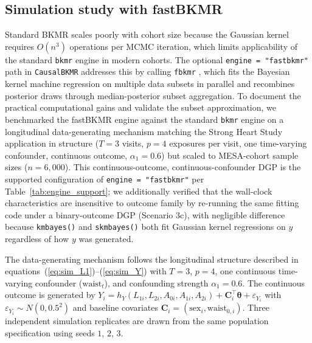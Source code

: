 \documentclass[11pt]{article}
\newcommand{\pkg}[1]{\texttt{#1}}
\newcommand{\code}[1]{\texttt{#1}}
\begin{document}
\subsection*{Simulation study with fastBKMR}

Standard BKMR scales poorly with cohort size because the Gaussian kernel requires $O(n^3)$ operations per MCMC iteration, which limits applicability of the standard \pkg{bkmr} engine in modern cohorts. The optional \code{engine = "fastbkmr"} path in \pkg{CausalBKMR} addresses this by calling \pkg{fbkmr} \citep{sonabend_fastbkmr_2026}, which fits the Bayesian kernel machine regression on multiple data subsets in parallel and recombines posterior draws through median-posterior subset aggregation. To document the practical computational gains and validate the subset approximation, we benchmarked the fastBKMR engine against the standard \pkg{bkmr} engine on a longitudinal data-generating mechanism matching the Strong Heart Study application in structure ($T=3$ visits, $p=4$ exposures per visit, one time-varying confounder, continuous outcome, $\alpha_1 = 0.6$) but scaled to MESA-cohort sample sizes ($n = 6{,}000$). This continuous-outcome, continuous-confounder DGP is the supported configuration of \code{engine = "fastbkmr"} per Table~\ref{tab:engine_support}; we additionally verified that the wall-clock characteristics are insensitive to outcome family by re-running the same fitting code under a binary-outcome DGP (Scenario 3c), with negligible difference because \code{kmbayes()} and \code{skmbayes()} both fit Gaussian kernel regressions on $y$ regardless of how $y$ was generated.

The data-generating mechanism follows the longitudinal structure described in equations~(\ref{eq:sim_L1})--(\ref{eq:sim_Y}) with $T=3$, $p=4$, one continuous time-varying confounder ($\text{waist}_t$), and confounding strength $\alpha_1 = 0.6$. The continuous outcome is generated by $Y_i = h_Y(L_{1i}, L_{2i}, A_{0i}, A_{1i}, A_{2i}) + \mathbf{C}_i^\top \boldsymbol{\theta} + \varepsilon_{Y_i}$ with $\varepsilon_{Y_i} \sim N(0, 0.5^2)$ and baseline covariates $\mathbf{C}_i = (\text{sex}_i, \text{waist}_{0,i})$. Three independent simulation replicates are drawn from the same population specification using seeds $1$, $2$, $3$.
\end{document}
